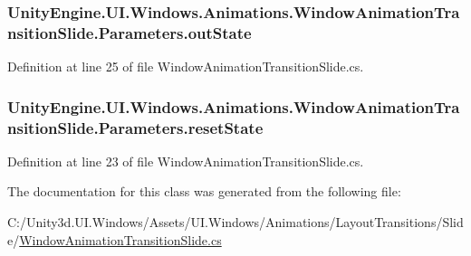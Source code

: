 \subsubsection[{out\+State}]{ Unity\+Engine.\+U\+I.\+Windows.\+Animations.\+Window\+Animation\+Transition\+Slide.\+Parameters.\+out\+State}\label{class_unity_engine_1_1_u_i_1_1_windows_1_1_animations_1_1_window_animation_transition_slide_1_1_parameters_a2079a5b6c1e887705032b31526726d98}


Definition at line 25 of file Window\+Animation\+Transition\+Slide.\+cs.

\hypertarget{class_unity_engine_1_1_u_i_1_1_windows_1_1_animations_1_1_window_animation_transition_slide_1_1_parameters_a13b0626d992e49dc5361c0b91b139924}{}
\subsubsection[{reset\+State}]{ Unity\+Engine.\+U\+I.\+Windows.\+Animations.\+Window\+Animation\+Transition\+Slide.\+Parameters.\+reset\+State}\label{class_unity_engine_1_1_u_i_1_1_windows_1_1_animations_1_1_window_animation_transition_slide_1_1_parameters_a13b0626d992e49dc5361c0b91b139924}


Definition at line 23 of file Window\+Animation\+Transition\+Slide.\+cs.



The documentation for this class was generated from the following file\+:\begin{DoxyCompactItemize}
\item 
C\+:/\+Unity3d.\+U\+I.\+Windows/\+Assets/\+U\+I.\+Windows/\+Animations/\+Layout\+Transitions/\+Slide/\hyperlink{_window_animation_transition_slide_8cs}{Window\+Animation\+Transition\+Slide.\+cs}\end{DoxyCompactItemize}
